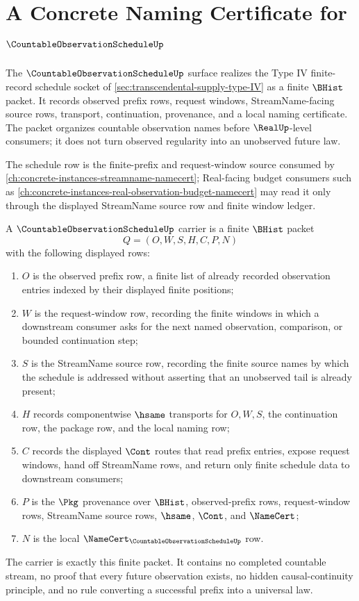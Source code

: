 \chapter{A Concrete Naming Certificate for $\CountableObservationScheduleUp$}
\label{ch:concrete-instances-countableobservationschedule-namecert}

The $\CountableObservationScheduleUp$ surface realizes the Type IV finite-record schedule socket of \autoref{sec:transcendental-supply-type-IV} as a finite $\BHist$ packet. It records observed prefix rows, request windows, StreamName-facing source rows, transport, continuation, provenance, and a local naming certificate. The packet organizes countable observation names before $\RealUp$-level consumers; it does not turn observed regularity into an unobserved future law.

The schedule row is the finite-prefix and request-window source consumed by \autoref{ch:concrete-instances-streamname-namecert}; Real-facing budget consumers such as \autoref{ch:concrete-instances-real-observation-budget-namecert} may read it only through the displayed StreamName source row and finite window ledger.

\begin{definition}
\label{def:countable-observation-schedule-carrier}
A $\CountableObservationScheduleUp$ carrier is a finite $\BHist$ packet
$$
Q=(O,W,S,H,C,P,N)
$$
with the following displayed rows:
\begin{enumerate}
\item $O$ is the observed prefix row, a finite list of already recorded observation entries indexed by their displayed finite positions;
\item $W$ is the request-window row, recording the finite windows in which a downstream consumer asks for the next named observation, comparison, or bounded continuation step;
\item $S$ is the StreamName source row, recording the finite source names by which the schedule is addressed without asserting that an unobserved tail is already present;
\item $H$ records componentwise $\hsame$ transports for $O,W,S$, the continuation row, the package row, and the local naming row;
\item $C$ records the displayed $\Cont$ routes that read prefix entries, expose request windows, hand off StreamName rows, and return only finite schedule data to downstream consumers;
\item $P$ is the $\Pkg$ provenance over $\BHist$, observed-prefix rows, request-window rows, StreamName source rows, $\hsame$, $\Cont$, and $\NameCert$;
\item $N$ is the local $\NameCert_{\CountableObservationScheduleUp}$ row.
\end{enumerate}
The carrier is exactly this finite packet. It contains no completed countable stream, no proof that every future observation exists, no hidden causal-continuity principle, and no rule converting a successful prefix into a universal law.
\end{definition}

